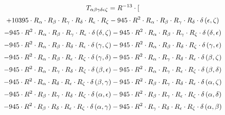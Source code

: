 \begin{subequations}\begin{gather}
T_{\alpha{}\beta{}\gamma{}\delta{}\epsilon{}\zeta{}} = R^{-13} \cdot [ 
 \\[0.2em] \notag + 10395 \cdot R_{\alpha{}} \cdot R_{\beta{}} \cdot R_{\gamma{}} \cdot R_{\delta{}} \cdot R_{\epsilon{}} \cdot R_{\zeta{}}- 945 \cdot R^{2} \cdot R_{\alpha{}} \cdot R_{\beta{}} \cdot R_{\gamma{}} \cdot R_{\delta{}} \cdot \delta{}\left(\epsilon{}, \zeta{}\right) 
 \\[0.2em] \notag 		 - 945 \cdot R^{2} \cdot R_{\alpha{}} \cdot R_{\beta{}} \cdot R_{\gamma{}} \cdot R_{\epsilon{}} \cdot \delta{}\left(\delta{}, \zeta{}\right)- 945 \cdot R^{2} \cdot R_{\alpha{}} \cdot R_{\beta{}} \cdot R_{\gamma{}} \cdot R_{\zeta{}} \cdot \delta{}\left(\delta{}, \epsilon{}\right) 
 \\[0.2em] \notag 		 - 945 \cdot R^{2} \cdot R_{\alpha{}} \cdot R_{\beta{}} \cdot R_{\delta{}} \cdot R_{\epsilon{}} \cdot \delta{}\left(\gamma{}, \zeta{}\right)- 945 \cdot R^{2} \cdot R_{\alpha{}} \cdot R_{\beta{}} \cdot R_{\delta{}} \cdot R_{\zeta{}} \cdot \delta{}\left(\gamma{}, \epsilon{}\right) 
 \\[0.2em] \notag 		 - 945 \cdot R^{2} \cdot R_{\alpha{}} \cdot R_{\beta{}} \cdot R_{\epsilon{}} \cdot R_{\zeta{}} \cdot \delta{}\left(\gamma{}, \delta{}\right)- 945 \cdot R^{2} \cdot R_{\alpha{}} \cdot R_{\gamma{}} \cdot R_{\delta{}} \cdot R_{\epsilon{}} \cdot \delta{}\left(\beta{}, \zeta{}\right) 
 \\[0.2em] \notag 		 - 945 \cdot R^{2} \cdot R_{\alpha{}} \cdot R_{\gamma{}} \cdot R_{\delta{}} \cdot R_{\zeta{}} \cdot \delta{}\left(\beta{}, \epsilon{}\right)- 945 \cdot R^{2} \cdot R_{\alpha{}} \cdot R_{\gamma{}} \cdot R_{\epsilon{}} \cdot R_{\zeta{}} \cdot \delta{}\left(\beta{}, \delta{}\right) 
 \\[0.2em] \notag 		 - 945 \cdot R^{2} \cdot R_{\alpha{}} \cdot R_{\delta{}} \cdot R_{\epsilon{}} \cdot R_{\zeta{}} \cdot \delta{}\left(\beta{}, \gamma{}\right)- 945 \cdot R^{2} \cdot R_{\beta{}} \cdot R_{\gamma{}} \cdot R_{\delta{}} \cdot R_{\epsilon{}} \cdot \delta{}\left(\alpha{}, \zeta{}\right) 
 \\[0.2em] \notag 		 - 945 \cdot R^{2} \cdot R_{\beta{}} \cdot R_{\gamma{}} \cdot R_{\delta{}} \cdot R_{\zeta{}} \cdot \delta{}\left(\alpha{}, \epsilon{}\right)- 945 \cdot R^{2} \cdot R_{\beta{}} \cdot R_{\gamma{}} \cdot R_{\epsilon{}} \cdot R_{\zeta{}} \cdot \delta{}\left(\alpha{}, \delta{}\right) 
 \\[0.2em] \notag 		 - 945 \cdot R^{2} \cdot R_{\beta{}} \cdot R_{\delta{}} \cdot R_{\epsilon{}} \cdot R_{\zeta{}} \cdot \delta{}\left(\alpha{}, \gamma{}\right)- 945 \cdot R^{2} \cdot R_{\gamma{}} \cdot R_{\delta{}} \cdot R_{\epsilon{}} \cdot R_{\zeta{}} \cdot \delta{}\left(\alpha{}, \beta{}\right) 

\end{gather}
\end{subequations}
